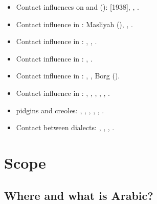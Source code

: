 \documentclass[output=paper]{langsci/langscibook}
\begin{document}
\begin{itemize}[noitemsep,leftmargin=11pt]
\item[\adfhalfrightarrowhead]Contact influences on  and   (): \citet{Jeffrey2007} [1938], \citet{Blau1969}, \citet{Hebbo1984}.

\item[\adfhalfrightarrowhead]Contact influence in  : Masliyah (\citeyear{Masliyah1996,Masliyah1997}), \citet{MatrasShabibi2007}, \citet{ElZarkaZiagos2019}.

\item[\adfhalfrightarrowhead]Contact influence in  : \citet{Jastrow2005}, \citet{Ratcliffe2005}, \citet{Ingham2011afg}.

\item[\adfhalfrightarrowhead]Contact influence in  : \citet{Barbot1961}, \citet{Neishtadt2015}.

\item[\adfhalfrightarrowhead]Contact influence in  : \citet{Newton1964}, \citet{Tsiapera1964}, Borg (\citeyear{Borg1997CMA,Borg2004}).

\item[\adfhalfrightarrowhead]Contact influence in : \citet{colin1957}, \citet{Aquilina1958}, \citet{krier1976},  \citet{mifsudloanverbs}, \citet{brincat2011}, \citet{Souag2018berber}.

\item[\adfhalfrightarrowhead] pidgins and creoles: \citet{Owens1985}, \citet{Miller1993}, \citet{Luffin2014}, \citet{Avram2017article}, \citet{Bizri2018}, \citet{Owens2018}.

\item[\adfhalfrightarrowhead]Contact between  dialects:  \citet{Gibson2002}, \citet{Miller2007}, \citet{CotterHoresh2015}, \citet{Leddy-Cecere2018}.

\end{itemize}

\section{Scope}\label{introscope}

\subsection{Where and what is Arabic?}\label{introwherewhat}
\end{document}
